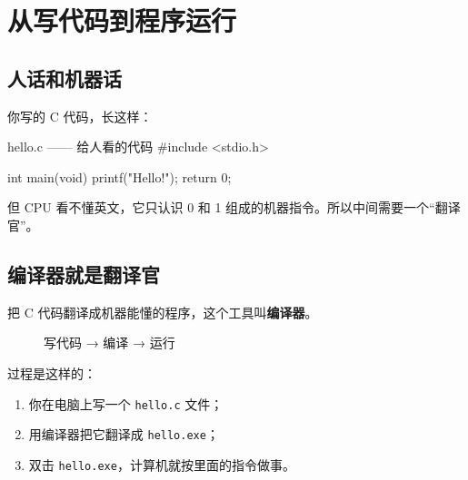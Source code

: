 \section{从写代码到程序运行}

\subsection{人话和机器话}

你写的 C 代码，长这样：

\begin{codebox}{hello.c —— 给人看的代码}
#include <stdio.h>

int main(void)
{
    printf("Hello!\n");
    return 0;
}
\end{codebox}

但 CPU 看不懂英文，它只认识 0 和 1 组成的机器指令。所以中间需要一个“翻译官”。

\subsection{编译器就是翻译官}

把 C 代码翻译成机器能懂的程序，这个工具叫\textbf{编译器}。

\begin{figure}[htbp]
  \centering
  \caption{写代码 → 编译 → 运行}
  \label{fig:compile-simple}
\end{figure}

过程是这样的：

\begin{enumerate}
  \item 你在电脑上写一个 \texttt{hello.c} 文件；
  \item 用编译器把它翻译成 \texttt{hello.exe}；
  \item 双击 \texttt{hello.exe}，计算机就按里面的指令做事。
\end{enumerate}

